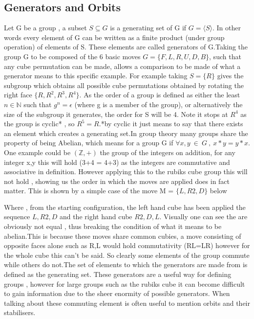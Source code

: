 \documentclass{article}
\begin{document}
\subsection{Generators and Orbits}
Let G be a group , a subset $S\subseteq G$ is a generating set of G if $G =\langle S\rangle $. In other words every element of G can be written as a finite product (under group operation)  of elements of S. These elements are called generators of G.Taking the group G to be composed of the 6 basic moves  $G= \{{F,L,R,U,D,B}\}$, such that  any cube permutation can be made, allows  a comparison to be made of what a generator means to this specific example.  For example taking $S=\{R\}$ gives the subgroup which obtains all possible cube permutations obtained by rotating the right face $\{R,R^2,R^3,R^4\}$. As the order of a group is defined as either the least $n \in \mathbb{N}$ such that $g^n = \epsilon$ (where g is a member of the group),  or alternatively the size of the subgroup it generates, the order for S will be 4. Note it stops at $R^4$ as the group is cyclic* , so $R^5= R$.*by cyclic it just means to say that there exists an element which creates a generating set.\newline In group theory many groups share the property of being Abelian, which means for a group G if $\forall x,y\ \in\ G\ ,\ x*y=y*x$. One example could be $(\mathbb{Z},+)$ the group of the integers on addition, for any integer x,y this will hold (3+4 = 4+3) as the integers are commutative and associative in definition.
However applying this to the rubiks cube group this will not hold , showing us the order in which the moves are applied does in fact matter. This is shown by a simple case of the move M = $\{L,R2,D\}$ below

\begin{figure}[h]
\centering
  \RubikCubeSolved%
  \RubikCubeSolved%
  \hspace{.4cm}
\end{figure}
Where , from the starting configuration, the left hand cube has been applied the sequence ${L,R2,D}$ and the right hand cube ${R2,D,L}$. Visually one can see the are obviously not equal , thus breaking the condition of what it means to be abelian.This is because these moves share common cubies, a move consisting of opposite faces alone such as R,L would hold commutativity (RL=LR) however for the whole cube this can't be said. So clearly some elements of the group commute while others do not.\newline The set of elements to which the generators are made from is defined as the generating set. These generators are a useful way for defining groups , however for large groups such as the rubiks cube it can become difficult to gain information due to the sheer enormity of possible generators. When talking about these commuting element is often useful to mention orbits and their stabilisers. 
\end{document}
